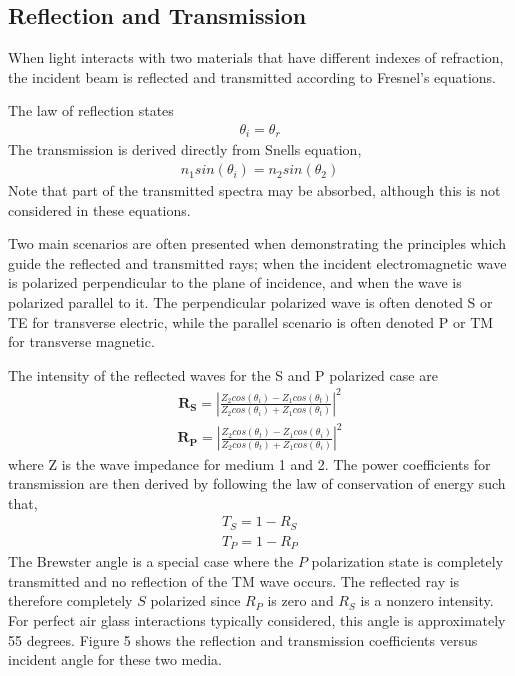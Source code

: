 \subsection{Reflection and Transmission}

When light interacts with two materials that have different indexes of refraction, the incident beam is reflected and transmitted according to Fresnel’s equations.

The law of reflection states
%
\begin{align}
    \theta_i = \theta_r
\end{align}
%
The transmission is derived directly from Snells equation,
%
\begin{align}
    n_1sin(\theta_i) = n_2sin(\theta_2)
\end{align}
%
Note that part of the transmitted spectra may be absorbed, although this is not considered in these equations.

Two main scenarios are often presented when demonstrating the principles which guide the reflected and transmitted rays; when the incident electromagnetic wave is polarized perpendicular to the plane of incidence, and when the wave is polarized parallel to it.  The perpendicular polarized wave is often denoted S or TE for transverse electric, while the parallel scenario is often denoted P or TM for transverse magnetic.


The intensity of the reflected waves for the S and P polarized case are
%
\begin{align}
    \mathbf{R_S} = |\frac{Z_2cos(\theta_i)-Z_1cos(\theta_t)}{Z_2cos(\theta_i)+Z_1cos(\theta_t)}|^2
\end{align}
\begin{align}
    \mathbf{R_P} = |\frac{Z_2cos(\theta_t)-Z_1cos(\theta_i)}{Z_2cos(\theta_t)+Z_1cos(\theta_i)}|^2
\end{align}
%
where Z is the wave impedance for medium 1 and 2.  The power coefficients for transmission are then derived by following the law of conservation of energy such that,
%
\begin{align}
    T_S = 1 - R_S \\
    T_P = 1 - R_P
\end{align}
%
The Brewster angle is a special case where the $P$ polarization state is completely transmitted and no reflection of the TM wave occurs.  The reflected ray is therefore completely $S$ polarized since $R_P$ is zero and $R_S$ is a nonzero intensity.  For perfect air glass interactions typically considered, this angle is approximately 55 degrees.  Figure 5 shows the reflection and transmission coefficients versus incident angle for these two media.


